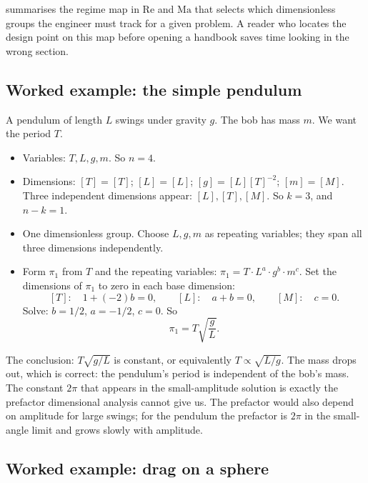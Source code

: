 

 summarises the regime map in
$\mathrm{Re}$ and $\mathrm{Ma}$ that selects which dimensionless
groups the engineer must track for a given problem. A reader who
locates the design point on this map before opening a handbook
saves time looking in the wrong section.



\subsection{Worked example: the simple pendulum}

A pendulum of length $L$ swings under gravity $g$. The bob has mass
$m$. We want the period $T$.

\begin{itemize}[leftmargin=*]
  \item Variables: $T, L, g, m$. So $n = 4$.
  \item Dimensions: $[T] = [T]$; $[L] = [L]$; $[g] = [L][T]^{-2}$;
    $[m] = [M]$. Three independent dimensions appear: $[L], [T],
    [M]$. So $k = 3$, and $n - k = 1$.
  \item One dimensionless group. Choose $L, g, m$ as repeating
    variables; they span all three dimensions independently.
  \item Form $\pi_{1}$ from $T$ and the repeating variables:
    $\pi_{1} = T \cdot L^{a} \cdot g^{b} \cdot m^{c}$. Set the
    dimensions of $\pi_{1}$ to zero in each base dimension:
    \[
    [T]: \quad 1 + (-2)b = 0, \qquad
    [L]: \quad a + b = 0, \qquad
    [M]: \quad c = 0.
    \]
    Solve: $b = 1/2$, $a = -1/2$, $c = 0$. So
    \[
    \pi_{1} = T \sqrt{\frac{g}{L}}.
    \]
\end{itemize}

The conclusion: $T \sqrt{g/L}$ is constant, or equivalently
$T \propto \sqrt{L/g}$. The mass drops out, which is correct: the
pendulum's period is independent of the bob's mass. The constant
$2\pi$ that appears in the small-amplitude solution is exactly the
prefactor dimensional analysis cannot give us. The prefactor would
also depend on amplitude for large swings; for the pendulum the
prefactor is $2\pi$ in the small-angle limit and grows slowly with
amplitude.

\subsection{Worked example: drag on a sphere}

